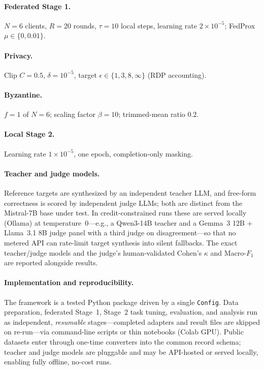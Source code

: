 \documentclass[11pt,a4paper]{article}
\begin{document}
\paragraph{Federated Stage 1.} $N{=}6$ clients, $R{=}20$ rounds, $\tau{=}10$ local steps, learning rate $2{\times}10^{-5}$; FedProx $\mu\in\{0,0.01\}$.
\paragraph{Privacy.} Clip $C{=}0.5$, $\delta{=}10^{-5}$, target $\epsilon \in \{1,3,8,\infty\}$ (RDP accounting).
\paragraph{Byzantine.} $f{=}1$ of $N{=}6$; scaling factor $\beta{=}10$; trimmed-mean ratio $0.2$.
\paragraph{Local Stage 2.} Learning rate $1{\times}10^{-5}$, one epoch, completion-only masking.
\paragraph{Teacher and judge models.} Reference targets are synthesized by an independent teacher LLM, and free-form correctness is scored by independent judge LLMs; both are distinct from the Mistral-7B base under test. In credit-constrained runs these are served locally (Ollama) at temperature~0---e.g., a Qwen3-14B teacher and a Gemma~3 12B $+$ Llama~3.1 8B judge panel with a third judge on disagreement---so that no metered API can rate-limit target synthesis into silent fallbacks. The exact teacher/judge models and the judge's human-validated Cohen's $\kappa$ and Macro-$F_1$ are reported alongside results.
\paragraph{Implementation and reproducibility.} The framework is a tested Python package driven by a single \texttt{Config}. Data preparation, federated Stage~1, Stage~2 task tuning, evaluation, and analysis run as independent, \emph{resumable} stages---completed adapters and result files are skipped on re-run---via command-line scripts or thin notebooks (Colab GPU). Public datasets enter through one-time converters into the common record schema; teacher and judge models are pluggable and may be API-hosted or served locally, enabling fully offline, no-cost runs.
\end{document}
